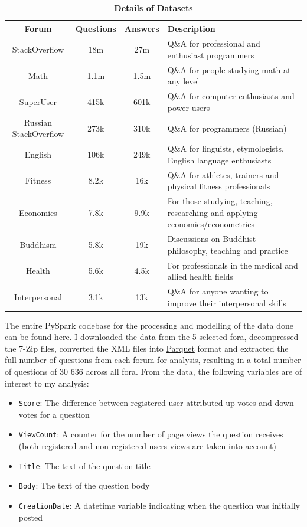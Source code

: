 \documentclass[11pt,preprint, authoryear]{article}
\numberwithin{equation}{section}
\begin{document}
\begin{longtable} {@{} cccp{9cm} @{}}
\caption{\textbf{Details of Datasets}}
\label{tab:fora}\\ 
\toprule
Forum & Questions & Answers & Description \\ 
\midrule
StackOverflow & 18m & 27m & Q\&A for professional and enthusiast programmers \\
Math & 1.1m & 1.5m & Q\&A for people studying math at any level \\
SuperUser & 415k & 601k & Q\&A for computer enthusiasts and power users \\ 
Russian StackOverflow & 273k & 310k & Q\&A for programmers (Russian) \\ 
English & 106k & 249k & Q\&A for linguists, etymologists, English language enthusiasts \\ 
Fitness & 8.2k & 16k & Q\&A for athletes, trainers and physical fitness professionals \\ 
Economics & 7.8k & 9.9k & For those studying, teaching, researching and applying economics/econometrics \\
Buddhism & 5.8k & 19k & Discussions on Buddhist philosophy, teaching and practice \\
Health & 5.6k & 4.5k & For professionals in the medical and allied health fields \\ 
Interpersonal & 3.1k & 13k & Q\&A for anyone wanting to improve their interpersonal skills \\ 
\bottomrule
\end{longtable}

\normalsize

The entire PySpark codebase for the processing and modelling of the data
done can be found
\href{https://github.com/BCallumCarr/msc-lse-thesis/tree/master/01-python-code}{here}.
I downloaded the data from the 5 selected fora, decompressed the 7-Zip
files, converted the XML files into
\href{https://parquet.apache.org}{Parquet} format and extracted the full
number of questions from each forum for analysis, resulting in a total
number of questions of 30 636 across all fora. From the data, the
following variables are of interest to my analysis:


\begin{itemize}
\item
  \texttt{Score}: The difference between registered-user attributed
  up-votes and down-votes for a question
\item
  \texttt{ViewCount}: A counter for the number of page views the
  question receives (both registered and non-registered users views are
  taken into account)
\item
  \texttt{Title}: The text of the question title
\item
  \texttt{Body}: The text of the question body
\item
  \texttt{CreationDate}: A datetime variable indicating when the
  question was initially posted
\end{itemize}
\end{document}

